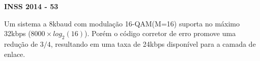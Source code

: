 \textbf{INSS 2014 - 53}

Um sistema a 8kbaud com modulação 16-QAM(M=16) suporta no máximo 32kbps ($8000\times log_2(16)$). Porém o código corretor de erro promove uma redução de $3/4$, resultando em uma taxa de 24kbps disponível para a camada de enlace.